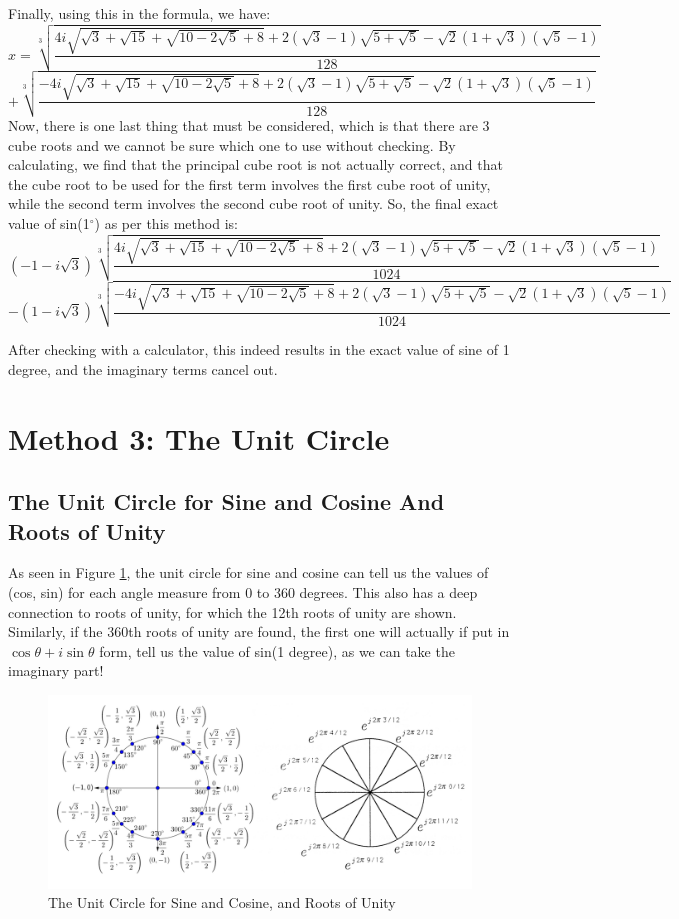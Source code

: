 \documentclass[12pt]{article}
\begin{document}
Finally, using this in the formula, we have:
\small\[ x = \sqrt[3]{\frac{4i\sqrt{\sqrt{3}+\sqrt{15} + \sqrt{10-2\sqrt{5}}+8}+2 (\sqrt{3} - 1) \sqrt{5 + \sqrt{5}} - \sqrt{2} (1 + \sqrt{3}) (\sqrt{5} - 1)}{128}}\]
\[+\sqrt[3]{\frac{-4i\sqrt{\sqrt{3}+\sqrt{15} + \sqrt{10-2\sqrt{5}}+8}+2 (\sqrt{3} - 1) \sqrt{5 + \sqrt{5}} - \sqrt{2} (1 + \sqrt{3}) (\sqrt{5} - 1)}{128}} \]
Now, there is one last thing that must be considered, which is that there are 3 cube roots and we cannot be sure which one to use without checking. By calculating, we find that the principal cube root is not actually correct, and that the cube root to be used for the first term involves the first cube root of unity, while the second term involves the second cube root of unity. So, the final exact value of sin(1$^{\circ}$) as per this method is:
\[(-1-i\sqrt{3})\sqrt[3]{\frac{4i\sqrt{\sqrt{3}+\sqrt{15} + \sqrt{10-2\sqrt{5}}+8}+2 (\sqrt{3} - 1) \sqrt{5 + \sqrt{5}} - \sqrt{2} (1 + \sqrt{3}) (\sqrt{5} - 1)}{1024}}\]
\[-(1-i\sqrt{3})\sqrt[3]{\frac{-4i\sqrt{\sqrt{3}+\sqrt{15} + \sqrt{10-2\sqrt{5}}+8}+2 (\sqrt{3} - 1) \sqrt{5 + \sqrt{5}} - \sqrt{2} (1 + \sqrt{3}) (\sqrt{5} - 1)}{1024}} \]

After checking with a calculator, this indeed results in the exact value of sine of 1 degree, and the imaginary terms cancel out.

\section{Method 3: The Unit Circle}
\subsection{The Unit Circle for Sine and Cosine And Roots of Unity}
As seen in Figure \ref{fig:uC}, the unit circle for sine and cosine can tell us the values of (cos, sin) for each angle measure from 0 to 360 degrees. This also has a deep connection to roots of unity, for which the 12th roots of unity are shown. Similarly, if the 360th roots of unity are found, the first one will actually if put in $\cos \theta + i\sin \theta$ form, tell us the value of sin(1 degree), as we can take the imaginary part!
\begin{figure}[h]
    \centering
    \includegraphics[width=0.9\linewidth]{unit-circle.png}
    \caption{The Unit Circle for Sine and Cosine, and Roots of Unity}
    \label{fig:uC}
\end{figure}
\end{document}
